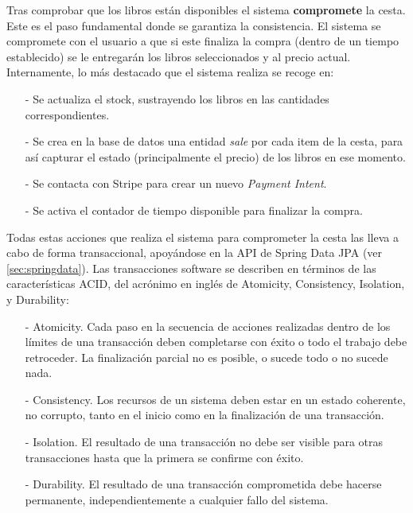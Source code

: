 \documentclass[a4paper]{article}
\begin{document}
    Tras comprobar que los libros están disponibles el sistema \textbf{compromete} la cesta. Este es el paso fundamental donde se garantiza la consistencia. El sistema se compromete con el usuario a que si este finaliza la compra (dentro de un tiempo establecido) se le entregarán los libros seleccionados y al precio actual. Internamente, lo más destacado que el sistema realiza se recoge en:
    
    \begin{itemize}
    	\item[-] Se actualiza el stock, sustrayendo los libros en las cantidades correspondientes.
    	\item[-] Se crea en la base de datos una entidad \emph{sale} por cada item de la cesta, para así capturar el estado (principalmente el precio) de los libros en ese momento.
    	\item[-] Se contacta con Stripe para crear un nuevo \emph{Payment Intent}.
    	\item[-] Se activa el contador de tiempo disponible para finalizar la compra.
    \end{itemize}
    
    Todas estas acciones que realiza el sistema para comprometer la cesta las lleva a cabo de forma transaccional, apoyándose en la API de Spring Data JPA (ver \ref{sec:springdata}). Las transacciones software se describen en términos de las características ACID, del acrónimo en inglés de Atomicity, Consistency, Isolation, y Durability:
    
    \begin{itemize}
    	\item[-] Atomicity. Cada paso en la secuencia de acciones realizadas dentro de los límites de una transacción deben completarse con éxito o todo el trabajo debe
    	retroceder. La finalización parcial no es posible, o sucede todo o no sucede nada.
    	\item[-] Consistency. Los recursos de un sistema deben estar en un estado coherente, no corrupto, tanto en el inicio como en la finalización de una transacción.
    	\item[-] Isolation. El resultado de una transacción no debe ser visible para otras transacciones hasta que la primera se confirme con éxito.
    	\item[-] Durability. El resultado de una transacción comprometida debe hacerse permanente, independientemente a cualquier fallo del sistema.
    \end{itemize}
    
\end{document}
